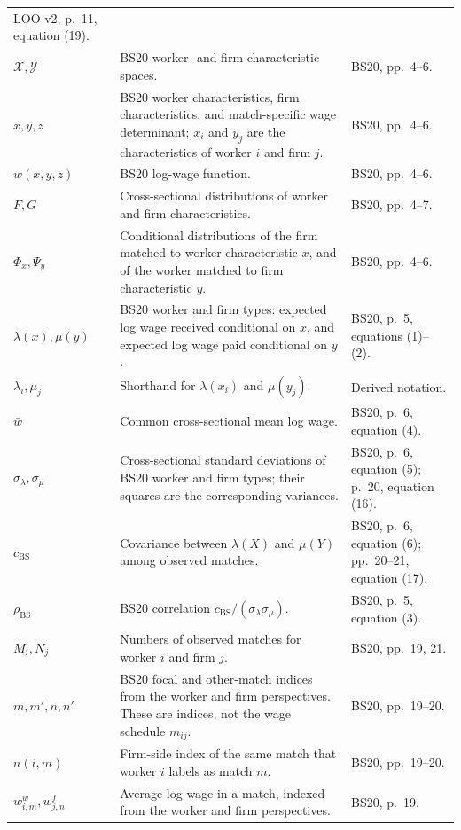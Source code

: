 \documentclass[11pt]{article}
\begin{document}
\begin{longtable}{p{}p{}p{}}
LOO-v2, p.\ 11, equation (19). \\
\(\mathcal X,\mathcal Y\) & BS20 worker- and firm-characteristic spaces. &
BS20, pp.\ 4--6. \\
\(x,y,z\) & BS20 worker characteristics, firm characteristics, and
match-specific wage determinant; \(x_i\) and \(y_j\) are the characteristics
of worker \(i\) and firm \(j\). & BS20, pp.\ 4--6. \\
\(w(x,y,z)\) & BS20 log-wage function. & BS20, pp.\ 4--6. \\
\(F,G\) & Cross-sectional distributions of worker and firm characteristics. &
BS20, pp.\ 4--7. \\
\(\Phi_x,\Psi_y\) & Conditional distributions of the firm matched to worker
characteristic \(x\), and of the worker matched to firm characteristic \(y\).
& BS20, pp.\ 4--6. \\
\(\lambda(x),\mu(y)\) & BS20 worker and firm types: expected log wage received
conditional on \(x\), and expected log wage paid conditional on \(y\). &
BS20, p.\ 5, equations (1)--(2). \\
\(\lambda_i,\mu_j\) & Shorthand for \(\lambda(x_i)\) and \(\mu(y_j)\). &
Derived notation. \\
\(\bar w\) & Common cross-sectional mean log wage. & BS20, p.\ 6,
equation (4). \\
\(\sigma_\lambda,\sigma_\mu\) & Cross-sectional standard deviations of BS20
worker and firm types; their squares are the corresponding variances. &
BS20, p.\ 6, equation (5); p.\ 20, equation (16). \\
\(c_{\mathrm{BS}}\) & Covariance between \(\lambda(X)\) and \(\mu(Y)\) among
observed matches. & BS20, p.\ 6, equation (6); pp.\ 20--21, equation (17). \\
\(\rho_{\mathrm{BS}}\) & BS20 correlation
\(c_{\mathrm{BS}}/(\sigma_\lambda\sigma_\mu)\). & BS20, p.\ 5,
equation (3). \\
\(M_i,N_j\) & Numbers of observed matches for worker \(i\) and firm \(j\). &
BS20, pp.\ 19, 21. \\
\(m,m',n,n'\) & BS20 focal and other-match indices from the worker and firm
perspectives.  These are indices, not the wage schedule \(m_{ij}\). &
BS20, pp.\ 19--20. \\
\(n(i,m)\) & Firm-side index of the same match that worker \(i\) labels as
match \(m\). & BS20, pp.\ 19--20. \\
\(w^w_{i,m},w^f_{j,n}\) & Average log wage in a match, indexed from the worker
and firm perspectives. & BS20, p.\ 19. \\

\end{longtable}
\end{document}
